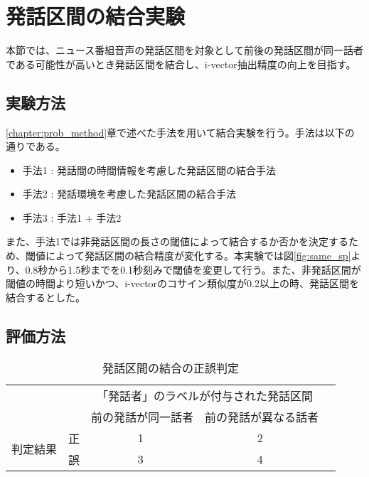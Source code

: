 \section{発話区間の結合実験}
本節では、ニュース番組音声の発話区間を対象として前後の発話区間が同一話者である可能性が高いとき発話区間を結合し、i-vector抽出精度の向上を目指す。
\subsection{実験方法}
\ref{chapter:prob_method}章で述べた手法を用いて結合実験を行う。手法は以下の通りである。

\begin{itemize}
\item 手法1 : 発話間の時間情報を考慮した発話区間の結合手法
\item 手法2 : 発話環境を考慮した発話区間の結合手法
\item 手法3 : 手法1 + 手法2
\end{itemize}\par\par

また、手法1では非発話区間の長さの閾値によって結合するか否かを決定するため、閾値によって発話区間の結合精度が変化する。本実験では図\ref{fig:same_sp}より、0.8秒から1.5秒までを0.1秒刻みで閾値を変更して行う。また、非発話区間が閾値の時間より短いかつ、i-vectorのコサイン類似度が0.2以上の時、発話区間を結合するとした。

\subsection{評価方法}

\begin{table}[H]
\begin{center}
    \caption{発話区間の結合の正誤判定 \label{table:connect_calc}}
\begin{tabular}{|c|c|c|c|l}
\cline{1-4}
\multicolumn{2}{|c|}{\multirow{2}{*}{}} & \multicolumn{2}{c|}{「発話者」のラベルが付与された発話区間} &  \\ \cline{3-4}
\multicolumn{2}{|c|}{}                  & 前の発話が同一話者        & 前の発話が異なる話者        &  \\ \cline{1-4}
\multirow{2}{*}{判定結果}        & 正        & \textcircled{\scriptsize 1}                  & \textcircled{\scriptsize 2}                   &  \\ \cline{2-4}
& 誤        & \textcircled{\scriptsize 3}                  & \textcircled{\scriptsize 4}                   &  \\ \cline{1-4}
\end{tabular}
\end{center}
\end{table}

